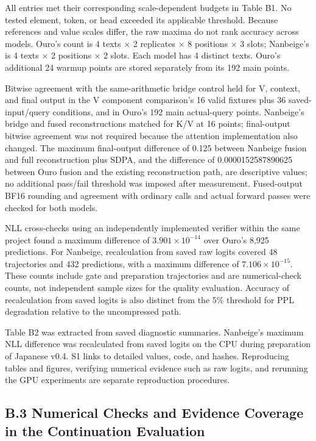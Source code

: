 \documentclass[10pt,a4paper]{article}
\begin{document}
All entries met their corresponding scale-dependent budgets in Table B1. No tested element, token, or head exceeded its applicable threshold. Because references and value scales differ, the raw maxima do not rank accuracy across models. Ouro's count is 4 texts × 2 replicates × 8 positions × 3 slots; Nanbeige's is 4 texts × 2 positions × 2 slots. Each model has 4 distinct texts. Ouro's additional 24 warmup points are stored separately from its 192 main points.

Bitwise agreement with the same-arithmetic bridge control held for V, context, and final output in the V component comparison's 16 valid fixtures plus 36 saved-input/query conditions, and in Ouro's 192 main actual-query points. Nanbeige's bridge and fused reconstructions matched for K/V at 16 points; final-output bitwise agreement was not required because the attention implementation also changed. The maximum final-output difference of 0.125 between Nanbeige fusion and full reconstruction plus SDPA, and the difference of 0.0000152587890625 between Ouro fusion and the existing reconstruction path, are descriptive values; no additional pass/fail threshold was imposed after measurement. Fused-output BF16 rounding and agreement with ordinary calls and actual forward passes were checked for both models.

NLL cross-checks using an independently implemented verifier within the same project found a maximum difference of \(3.901\times10^{-14}\) over Ouro's 8,925 predictions. For Nanbeige, recalculation from saved raw logits covered 48 trajectories and 432 predictions, with a maximum difference of \(7.106\times10^{-15}\). These counts include gate and preparation trajectories and are numerical-check counts, not independent sample sizes for the quality evaluation. Accuracy of recalculation from saved logits is also distinct from the 5\% threshold for PPL degradation relative to the uncompressed path.

Table B2 was extracted from saved diagnostic summaries. Nanbeige's maximum NLL difference was recalculated from saved logits on the CPU during preparation of Japanese v0.4. S1 links to detailed values, code, and hashes. Reproducing tables and figures, verifying numerical evidence such as raw logits, and rerunning the GPU experiments are separate reproduction procedures.

\subsection{B.3 Numerical Checks and Evidence Coverage in the Continuation Evaluation}\label{b.3-numerical-checks-and-evidence-coverage-in-the-continuation-evaluation}
\end{document}
